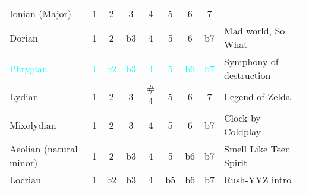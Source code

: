 \begin{table*}[!h]
\begin{adjustwidth}{-2.5cm}{}
\begin{tabular}{l|ccc cccc|l}
		\textcolor{yellow!90!black}{Ionian (Major)}  & \textcolor{yellow!90!black}{1}  
											  		  & \textcolor{yellow!90!black}{2}  
											  		  & \textcolor{yellow!90!black}{3}  
											  		  & \textcolor{yellow!90!black}{4} 
											  		  & \textcolor{yellow!90!black}{5}  
											  		  & \textcolor{yellow!90!black}{6} 
											  		  & \textcolor{yellow!90!black}{7} & \\ 
		\textcolor{green!60!white!70!black}{Dorian}  & \textcolor{green!60!white!70!black}{1} 
													  & \textcolor{green!60!white!70!black}{2} 
													  & \textcolor{green!60!white!70!black}{b3} 
													  & \textcolor{green!60!white!70!black}{4} 
													  & \textcolor{green!60!white!70!black}{5}  
													  & \textcolor{green!60!white!70!black}{6} 
													  & \textcolor{green!60!white!70!black}{b7} & Mad world, So What \\ 
		\textcolor{cyan}{Phrygian}                   & \textcolor{cyan}{1} 
													  & \textcolor{cyan}{b2} 
													  & \textcolor{cyan}{b3} 
													  & \textcolor{cyan}{4} 
													  & \textcolor{cyan}{5}  
													  & \textcolor{cyan}{b6} 
													  & \textcolor{cyan}{b7} & Symphony of destruction\\ 
		\textcolor{blue!50!white}{Lydian}            & \textcolor{blue!50!white}{1} 
													  & \textcolor{blue!50!white}{2}
													  & \textcolor{blue!50!white}{3}  
													  & \textcolor{blue!50!white}{$\#$4} 
													  & \textcolor{blue!50!white}{5}  
													  & \textcolor{blue!50!white}{6}  
													  & \textcolor{blue!50!white}{7}  
													  &  Legend of Zelda\\ 
		\textcolor{blue!50!red!50!white}{Mixolydian} & \textcolor{blue!50!red!50!white}{1} 
													  & \textcolor{blue!50!red!50!white}{2} 
													  & \textcolor{blue!50!red!50!white}{3} 
													  & \textcolor{blue!50!red!50!white}{4}    
													  & \textcolor{blue!50!red!50!white}{5}
													  & \textcolor{blue!50!red!50!white}{6}
													  & \textcolor{blue!50!red!50!white}{b7}
													  & Clock by Coldplay\\ 
		\textcolor{red!60!white}{Aeolian (natural minor)} & \textcolor{red!60!white}{1} 
													  & \textcolor{red!60!white}{2} 
													  & \textcolor{red!60!white}{b3} 
													  & \textcolor{red!60!white}{4}      
													  & \textcolor{red!60!white}{5}   
													  & \textcolor{red!60!white}{b6} 
													  & \textcolor{red!60!white}{b7} 
													  & Smell Like Teen Spirit\\
		\textcolor{orange!80!white}{Locrian}         & \textcolor{orange!80!white}{1}
													  & \textcolor{orange!80!white}{b2} 
													  & \textcolor{orange!80!white}{b3}
													  & \textcolor{orange!80!white}{4}   
													  & \textcolor{orange!80!white}{b5}
													  & \textcolor{orange!80!white}{b6}
													  & \textcolor{orange!80!white}{b7}
													  & Rush-YYZ intro\\ 
		

\end{tabular}
\end{adjustwidth}
\end{table*}
